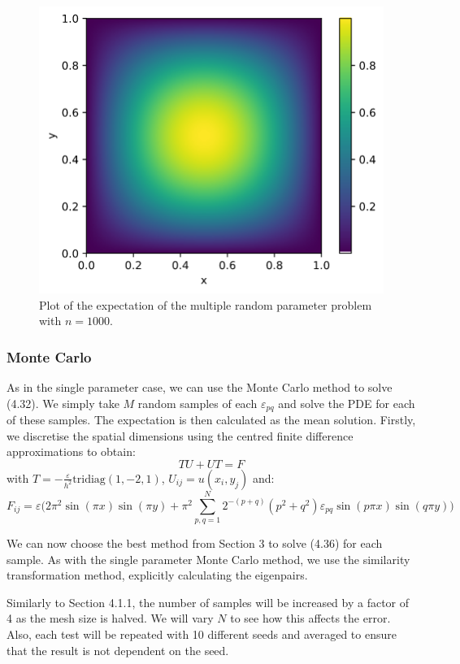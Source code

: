 \documentclass[11pt]{article}
\numberwithin{equation}{section}
\begin{document}
\begin{figure}[H]
\includegraphics[scale=.5]{img/solution2.png}
\centering
\caption{Plot of the expectation of the multiple random parameter problem with $n=1000$.}
\label{fig:multiple}
\end{figure} 

\subsubsection{Monte Carlo}
As in the single parameter case, we can use the Monte Carlo method to solve (4.32). We simply take $M$ random samples of each $\varepsilon_{pq}$ and solve the PDE for each of these samples. The expectation is then calculated as the mean solution. Firstly, we discretise the spatial dimensions using the centred finite difference approximations to obtain:
\begin{equation}
TU + UT = F
\end{equation}
with $T= -\frac{\varepsilon}{h^2}\text{tridiag}(1,-2,1)$, $U_{ij} = u(x_i,y_j)$ and: 
\[F_{ij}=\varepsilon \Big(2\pi^2 \sin(\pi x) \sin(\pi y) + \pi^2 \sum_{p,q=1}^N 2^{-(p+q)} (p^2 + q^2) \varepsilon_{pq} \sin(p \pi x)\sin(q \pi y) \Big) \]

We can now choose the best method from Section 3 to solve (4.36) for each sample. As with the single parameter Monte Carlo method, we use the similarity transformation method, explicitly calculating the eigenpairs. 

Similarly to Section 4.1.1, the number of samples will be increased by a factor of 4 as the mesh size is halved. We will vary $N$ to see how this affects the error. Also, each test will be repeated with 10 different seeds and averaged to ensure that the result is not dependent on the seed. 
\end{document}
